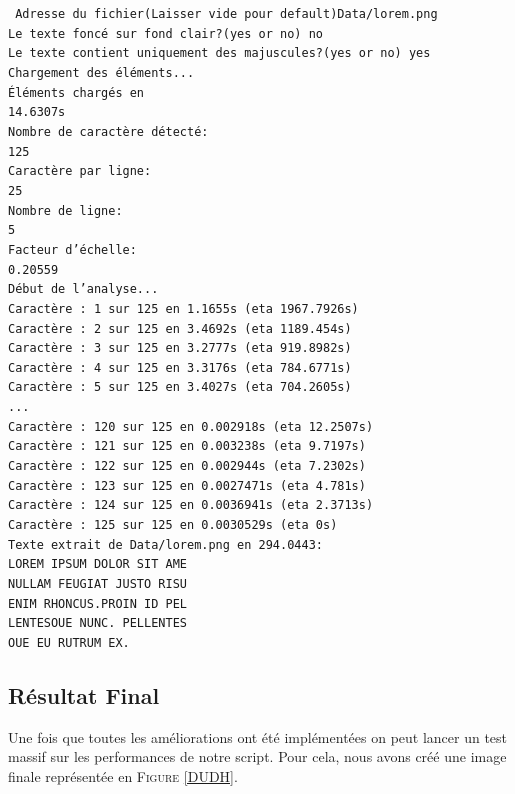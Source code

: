 \documentclass[a4paper,12pt,titlepage]{report}
\begin{document}
	\texttt{
	Adresse du fichier(Laisser vide pour default)Data/lorem.png\\
Le texte foncé sur fond clair?(yes or no) no\\
Le texte contient uniquement des majuscules?(yes or no) yes\\
Chargement des éléments...\\
Éléments chargés en \\
14.6307s\\
Nombre de caractère détecté:\\
 125\\
Caractère par ligne:\\
 25\\
Nombre de ligne:\\
 5\\
Facteur d'échelle:\\
 0.20559\\
Début de l'analyse...\\
Caractère : 1 sur 125 en 1.1655s (eta 1967.7926s)\\
Caractère : 2 sur 125 en 3.4692s (eta 1189.454s)\\
Caractère : 3 sur 125 en 3.2777s (eta 919.8982s)\\
Caractère : 4 sur 125 en 3.3176s (eta 784.6771s)\\
Caractère : 5 sur 125 en 3.4027s (eta 704.2605s)\\
	...\\
Caractère : 120 sur 125 en 0.002918s (eta 12.2507s)\\
Caractère : 121 sur 125 en 0.003238s (eta 9.7197s)\\
Caractère : 122 sur 125 en 0.002944s (eta 7.2302s)\\
Caractère : 123 sur 125 en 0.0027471s (eta 4.781s)\\
Caractère : 124 sur 125 en 0.0036941s (eta 2.3713s)\\
Caractère : 125 sur 125 en 0.0030529s (eta 0s)\\
Texte extrait de Data/lorem.png en 294.0443:\\
LOREM IPSUM DOLOR SIT AME\\
NULLAM FEUGIAT JUSTO RISU\\
ENIM RHONCUS.PROIN ID PEL\\
LENTESOUE NUNC. PELLENTES\\
OUE EU RUTRUM EX.\\}

	\vspace{-2em}
	\subsection{Résultat Final}
	Une fois que toutes les améliorations ont été implémentées on peut lancer un test massif sur les performances de notre script.
	Pour cela, nous avons créé une image finale représentée en \textsc{Figure \ref{DUDH}}.
	
\end{document}
